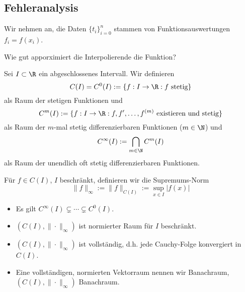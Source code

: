 \documentclass[11pt]{scrbook}
\begin{document}
\subsection{Fehleranalysis}

Wir nehmen an, die Daten $\{t_i\}_{i=0}^n$ stammen von Funktionsauswertungen $f_i=f(x_i)$.

Wie gut apporximiert die Interpolierende die Funktion?

\begin{df}
	\label{1.9}
	Sei $I\subset \R$ ein abgeschlossenes Intervall.
	Wir definieren
	\[
		C(I) = C^0(I) := \{f: I\to \R : f \text{ stetig}\}
	\]
	als Raum der stetigen Funktionen und
	\[
		C^m(I) := \{f: I\to \R : f,f',\dotsc,f^{(m)} \text{ existieren und stetig}\}
	\]
	als Raum der $m$-mal stetig differenzierbaren Funktionen ($m\in \N$) und
	\[
		C^\infty(I) := \bigcap_{m\in \N}C^m (I)
	\]
	als Raum der unendlich oft stetig differenzierbaren Funktionen.

	Für $f\in C(I)$, $I$ beschränkt, definieren wir die Supremums-Norm
	\[
		\|f\|_\infty := \|f\|_{C(I)} := \sup_{x\in I}|f(x)|
	\]
\end{df}

\begin{note}
	\begin{itemize}
		\item 
			Es gilt $C^\infty(I) \subsetneq \dotsb \subsetneq C^0(I)$.
		\item
			$(C(I), \|\cdot\|_\infty)$ ist normierter Raum für $I$ beschränkt.
		\item
			$(C(I),\|\cdot\|_\infty)$ ist vollständig, d.h. jede Cauchy-Folge konvergiert in $C(I)$.
		\item
			Eine vollständigen, normierten Vektorraum nennen wir Banachraum, $(C(I),\|\cdot\|_\infty)$ Banachraum.
	\end{itemize}
\end{note}
\end{document}
